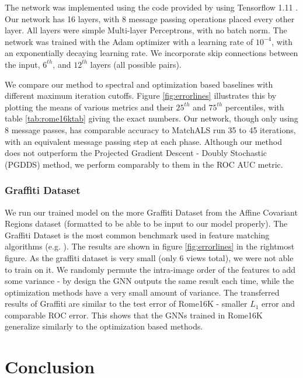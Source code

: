 \documentclass{article} %
\begin{document}
The network was implemented using the code provided by \cite{battaglia2018relational} using Tensorflow 1.11 \citep{tensorflow2015}.
Our network has 16 layers, with 8 message passing operations placed every other layer.
All layers were simple Multi-layer Perceptrons, with no batch norm.
The network was trained with the Adam optimizer \citep{kingma2014adam} with a learning rate of $10^{-4}$, with an exponentially decaying learning rate.
We incorporate skip connections between the input, $6^{th}$, and $12^{th}$ layers (all possible pairs).

We compare our method to spectral and optimization based baselines with different maximum iteration cutoffs.
Figure \ref{fig:errorlines} illustrates this by plotting the means of various metrics and their $25^{th}$ and $75^{th}$ percentiles, with table \ref{tab:rome16ktab} giving the exact numbers.
Our network, though only using 8 message passes, has comparable accuracy to MatchALS \citep{zhou2015multi} run 35 to 45 iterations, with an equivalent message passing step at each phase.
Although our method does not outperform the Projected Gradient Descent - Doubly Stochastic (PGDDS) \citep{leonardos2016distributed} method, we perform comparably to them in the ROC AUC metric.

\subsubsection{Graffiti Dataset} \label{sec:graffiti}
We run our trained model on the more Graffiti Dataset from the Affine Covariant Regions dataset (formatted to be able to be input to our model properly).
The Graffiti Dataset is the most common benchmark used in feature matching algorithms (e.g. \cite{leonardos2016distributed, zhou2015multi}).
The results are shown in figure \ref{fig:errorlines} in the rightmost figure.
As the graffiti dataset is very small (only 6 views total), we were not able to train on it.
We randomly permute the intra-image order of the features to add some variance - by design the GNN outputs the same result each time, while the optimization methods have a very small amount of variance.
The transferred results of Graffiti are similar to the test error of Rome16K - smaller $L_1$ error and comparable ROC error.
This shows that the GNNs trained in Rome16K generalize similarly to the optimization based methods.

\section{Conclusion}
\end{document}
